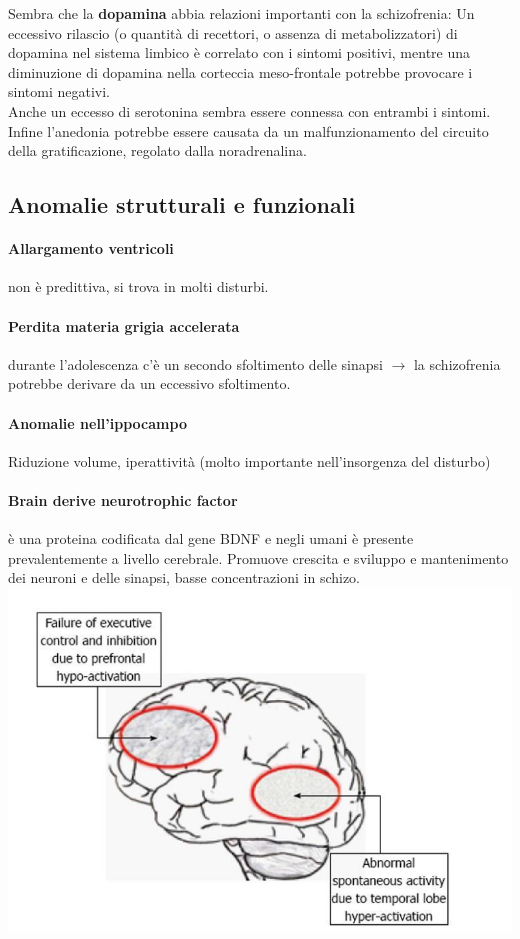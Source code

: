 \documentclass[12pt, a4paper]{article}
\begin{document}
Sembra che la \textbf{dopamina} abbia relazioni importanti con la schizofrenia:
Un eccessivo rilascio (o quantità di recettori, o assenza di metabolizzatori) di dopamina nel sistema limbico è correlato con i sintomi positivi, mentre una diminuzione di dopamina nella corteccia meso-frontale potrebbe provocare i sintomi negativi.
\medskip\\ 
Anche un eccesso di serotonina sembra essere connessa con entrambi i sintomi.
\medskip\\ 
Infine l'anedonia potrebbe essere causata da un malfunzionamento del circuito della gratificazione, regolato dalla noradrenalina.

\subsection{Anomalie strutturali e funzionali} 

\paragraph{Allargamento ventricoli}  non è predittiva, si trova in molti disturbi.

\paragraph{Perdita materia grigia accelerata} durante l'adolescenza c'è un secondo sfoltimento delle sinapsi $\rightarrow$ la schizofrenia potrebbe derivare da un eccessivo sfoltimento.

\paragraph{Anomalie nell'ippocampo}  Riduzione volume, iperattività (molto importante nell'insorgenza del disturbo)

\paragraph{Brain derive neurotrophic factor}  è una proteina codificata dal gene BDNF e negli umani è presente prevalentemente a livello cerebrale. Promuove crescita e sviluppo e mantenimento dei neuroni e delle sinapsi, basse concentrazioni in schizo.
\medskip\\
\includegraphics[width=\linewidth]{./images/image6}
\end{document}
